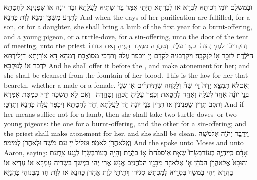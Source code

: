 {וּבְמִשְׁלַם יוֹמֵי דְּכוּתַהּ לִבְרָא אוֹ לִבְרַתָּא תַּיְתֵי אִמַּר בַּר שַׁתֵּיהּ לַעֲלָתָא וּבַר יוֹנָה אוֹ שַׁפְנִינָא לְחַטָּתָא לִתְרַע מַשְׁכַּן זִמְנָא לְוָת כָּהֲנָא׃}
{And when the days of her purification are fulfilled, for a son, or for a daughter, she shall bring a lamb of the first year for a burnt-offering, and a young pigeon, or a turtle-dove, for a sin-offering, unto the door of the tent of meeting, unto the priest.}{}
{וְהִקְרִיב֞וֹ לִפְנֵ֤י יְהֹוָה֙ וְכִפֶּ֣ר עָלֶ֔יהָ וְטָהֲרָ֖ה מִמְּקֹ֣ר דָּמֶ֑יהָ זֹ֤את תּוֹרַת֙ הַיֹּלֶ֔דֶת לַזָּכָ֖ר א֥וֹ לַנְּקֵבָֽה׃}
{וִיקָרְבִנֵּיהּ לִקְדָם יְיָ וִיכַפַּר עֲלַהּ וְתִדְכֵּי מִסּוֹאֲבָת דְּמַהָא דָּא אוֹרָיְתָא דְּיָלֵידְתָּא לִדְכַר אוֹ לְנוּקְבָּא׃}
{And he shall offer it before the \lord, and make atonement for her; and she shall be cleansed from the fountain of her blood. This is the law for her that beareth, whether a male or a female.}{}
{וְאִם\maqqaf לֹ֨א תִמְצָ֣א יָדָהּ֮ דֵּ֣י שֶׂה֒ וְלָקְחָ֣ה שְׁתֵּֽי\maqqaf תֹרִ֗ים א֤וֹ שְׁנֵי֙ בְּנֵ֣י יוֹנָ֔ה אֶחָ֥ד לְעֹלָ֖ה וְאֶחָ֣ד לְחַטָּ֑את וְכִפֶּ֥ר עָלֶ֛יהָ הַכֹּהֵ֖ן וְטָהֵֽרָה׃ \petucha }
{וְאִם לָא תַשְׁכַּח יְדַהּ כְּמִסַּת אִמְּרָא וְתִסַּב ‏‏תְּרֵין שַׁפְנִינִין אוֹ תְּרֵין בְּנֵי יוֹנָה חַד לַעֲלָתָא וְחַד לְחַטָּתָא וִיכַפַּר עֲלַהּ כָּהֲנָא וְתִדְכֵּי׃}
{And if her means suffice not for a lamb, then she shall take two turtle-doves, or two young pigeons: the one for a burnt-offering, and the other for a sin-offering; and the priest shall make atonement for her, and she shall be clean.}{}
\newperek
{}%
{וַיְדַבֵּ֣ר יְהֹוָ֔ה אֶל\maqqaf מֹשֶׁ֥ה וְאֶֽל\maqqaf אַהֲרֹ֖ן לֵאמֹֽר׃}
{וּמַלֵּיל יְיָ עִם מֹשֶׁה וּלְאַהֲרֹן לְמֵימַר׃}
{And the \lord\space spoke unto Moses and unto Aaron, saying:}{}
{אָדָ֗ם כִּֽי\maqqaf יִהְיֶ֤ה בְעוֹר\maqqaf בְּשָׂרוֹ֙ שְׂאֵ֤ת אֽוֹ\maqqaf סַפַּ֙חַת֙ א֣וֹ בַהֶ֔רֶת וְהָיָ֥ה בְעוֹר\maqqaf בְּשָׂר֖וֹ לְנֶ֣גַע צָרָ֑עַת וְהוּבָא֙ אֶל\maqqaf אַהֲרֹ֣ן הַכֹּהֵ֔ן א֛וֹ אֶל\maqqaf אַחַ֥ד מִבָּנָ֖יו הַכֹּהֲנִֽים׃}
{אֱנָשׁ אֲרֵי יְהֵי בִמְשַׁךְ בִּשְׂרֵיהּ עָמְקָא אוֹ עֶדְיָא אוֹ בַהֲרָא וִיהֵי בִמְשַׁךְ בִּסְרֵיהּ לְמַכְתָּשׁ סְגִירוּ וְיִתֵּיתֵי לְוָת אַהֲרֹן כָּהֲנָא אוֹ לְוָת חַד מִבְּנוֹהִי כָּהֲנַיָּא׃}
